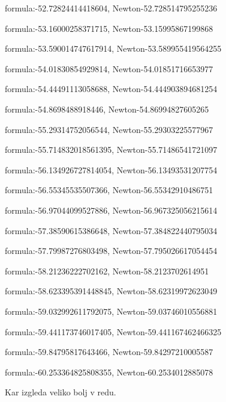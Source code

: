 \documentclass{article}
\begin{document}
formula:-52.72824414418604, Newton-52.728514795255236

formula:-53.16000258371715, Newton-53.15995867199868

formula:-53.590014747617914, Newton-53.589955419564255

formula:-54.01830854929814, Newton-54.01851716653977

formula:-54.44491113058688, Newton-54.444903894681254

formula:-54.8698488918446, Newton-54.86994827605265

formula:-55.29314752056544, Newton-55.29303225577967

formula:-55.714832018561395, Newton-55.71486541721097

formula:-56.134926727814054, Newton-56.13493531207754

formula:-56.55345535507366, Newton-56.55342910486751

formula:-56.97044099527886, Newton-56.967325056215614

formula:-57.38590615386648, Newton-57.384822440795034

formula:-57.79987276803498, Newton-57.795026617054454

formula:-58.21236222702162, Newton-58.2123702614951

formula:-58.623395391448845, Newton-58.62319972623049

formula:-59.032992611792075, Newton-59.03746010556881

formula:-59.441173746017405, Newton-59.441167462466325

formula:-59.84795817643466, Newton-59.84297210005587

formula:-60.253364825808355, Newton-60.2534012885078



Kar izgleda veliko bolj v redu.
\end{document}
